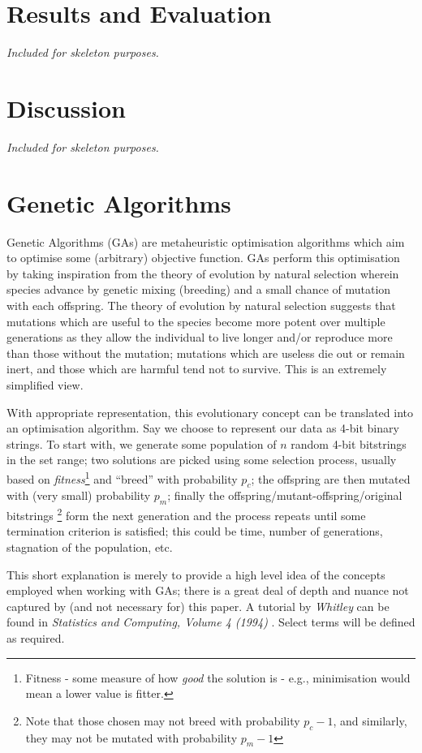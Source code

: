\documentclass[a4paper,11pt,twoside,openright]{article}
\let\oldsection\section
\def\section{\cleardoublepage\oldsection}
\begin{document}
\section{ Results and Evaluation } \label{sec:results}
\textit{Included for skeleton purposes.}
\newpage

\section{ Discussion }
\textit{Included for skeleton purposes.}
\newpage



\appendix
\section{Genetic Algorithms} \label{ap:ga}
Genetic Algorithms (GAs) are metaheuristic
optimisation algorithms which aim to optimise some (arbitrary) objective
function. GAs perform this optimisation by taking inspiration from the
theory of evolution by natural selection wherein species advance by genetic
mixing (breeding) and a small chance of mutation with each offspring.
The theory of evolution by natural selection suggests that mutations
which are useful to the species become more potent over multiple generations
as they allow the individual to live longer and/or reproduce more than those
without the mutation; mutations which are useless die out or remain inert, and
those which are harmful tend not to survive. This is an extremely simplified
view.
\newline
\par

With appropriate representation, this evolutionary concept can be
translated into an optimisation algorithm. Say we choose to represent our data as
4-bit binary strings. To start with, we generate some population of $n$ random
4-bit bitstrings in the set range; two solutions are picked using some selection
process, usually based on \textit{fitness}\footnote{Fitness - some measure of how
  \textit{good} the solution is - e.g., minimisation would mean a lower value is
  fitter.} and ``breed'' with probability $p_c$; the offspring are then mutated
with (very small) probability $p_m$; finally the
offspring/mutant-offspring/original bitstrings \footnote{Note that those chosen
  may not breed with probability $p_c - 1$, and
similarly, they may not be mutated with probability $p_m - 1$} form the next
generation and the process repeats until some termination criterion is satisfied;
this could be time, number of generations, stagnation of the population, etc.
\newline
\par

This short explanation is merely to provide a high level idea of the concepts
employed when working with GAs; there is a great deal of depth and nuance
not captured by (and not necessary for) this paper. A tutorial by
\textit{Whitley} can be found in \textit{Statistics and Computing, Volume 4
  (1994)} \cite{Whitley1994}. Select terms will be defined as required.
\end{document}
